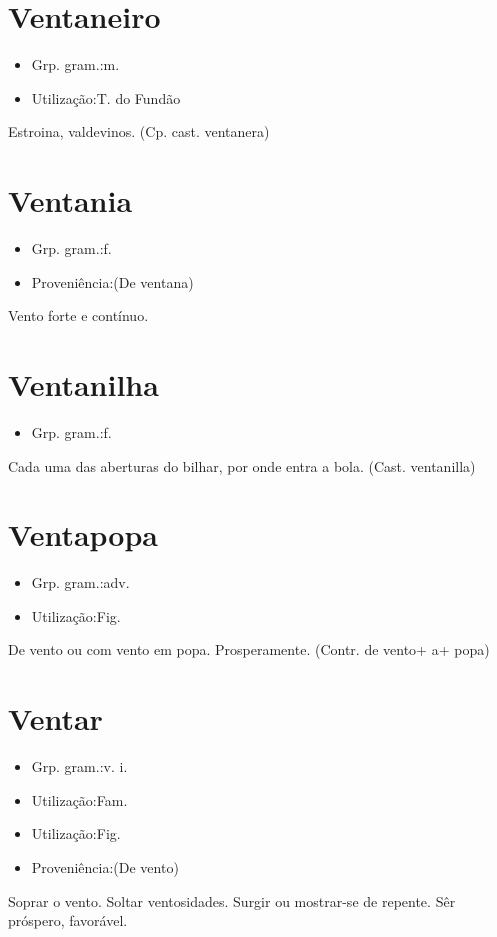 \documentclass{article}
\begin{document}
\section{Ventaneiro}
\begin{itemize}
\item {Grp. gram.:m.}
\end{itemize}
\begin{itemize}
\item {Utilização:T. do Fundão}
\end{itemize}
Estroina, valdevinos.
(Cp. cast. \textunderscore ventanera\textunderscore )
\section{Ventania}
\begin{itemize}
\item {Grp. gram.:f.}
\end{itemize}
\begin{itemize}
\item {Proveniência:(De \textunderscore ventana\textunderscore )}
\end{itemize}
Vento forte e contínuo.
\section{Ventanilha}
\begin{itemize}
\item {Grp. gram.:f.}
\end{itemize}
Cada uma das aberturas do bilhar, por onde entra a bola.
(Cast. \textunderscore ventanilla\textunderscore )
\section{Ventapopa}
\begin{itemize}
\item {Grp. gram.:adv.}
\end{itemize}
\begin{itemize}
\item {Utilização:Fig.}
\end{itemize}
De vento ou com vento em popa.
Prosperamente.
(Contr. de \textunderscore vento\textunderscore  + \textunderscore a\textunderscore  + \textunderscore popa\textunderscore )
\section{Ventar}
\begin{itemize}
\item {Grp. gram.:v. i.}
\end{itemize}
\begin{itemize}
\item {Utilização:Fam.}
\end{itemize}
\begin{itemize}
\item {Utilização:Fig.}
\end{itemize}
\begin{itemize}
\item {Proveniência:(De \textunderscore vento\textunderscore )}
\end{itemize}
Soprar o vento.
Soltar ventosidades.
Surgir ou mostrar-se de repente.
Sêr próspero, favorável.
\end{document}
